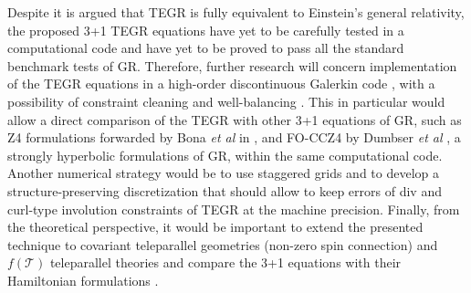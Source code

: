 \documentclass[
10pt, %
a4paper, %
oneside, %
twocolumn,
headinclude,footinclude, %
BCOR5mm, %
]{scrartcl}
\newcommand{\Tscal}{\mathcal{T}}		%
\begin{document}
	
	Despite it is argued that TEGR is fully equivalent to Einstein's general
	relativity, the proposed 3+1 TEGR equations have yet to be carefully tested
	in a computational code and have yet to be proved to pass all the standard
	benchmark tests of GR. Therefore, further research will concern
	implementation of the TEGR equations in a high-order discontinuous Galerkin
	code \cite{Dumbser2018a,Busto2020}, with a possibility of constraint
	cleaning  \cite{Dumbser2019} and well-balancing \cite{Gaburro2021}. This in
	particular would allow a direct comparison of the TEGR with other 	3+1
	equations of GR, such as Z4 formulations \cite{Alic2012} forwarded by Bona
	\textit{et al} in \cite{Z4}, and FO-CCZ4 by Dumbser \textit{et al}
	\cite{FO-CCZ4}, a strongly hyperbolic formulations of GR, within the same
	computational code.  Another numerical strategy would be to use staggered
	grids and to develop a structure-preserving discretization
	\cite{SIGPR2021,Olivares2022,Fambri2020a,oliynyk2025} that should allow to
	keep errors of div and curl-type involution constraints of TEGR at the
	machine precision. Finally, from the theoretical perspective, it would be
	important to extend the presented technique to covariant teleparallel
	geometries (non-zero spin connection) and $f(\Tscal)$ teleparallel theories
	and compare the 3+1 equations with their Hamiltonian formulations
	\cite{li2011d,li2011e,ferraro2018,blagojevic2020,bajardi2025}.
\end{document}
